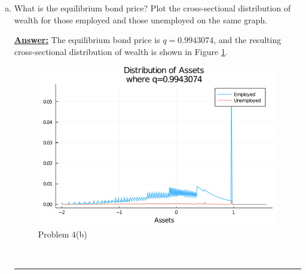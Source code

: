 \documentclass{article} %
\theoremstyle{definition}
\newenvironment{solution}[1][Answer]{\begin{singlespace}\underline{\textbf{#1:}}\quad }{\ \rule{0.3em}{0.3em}\end{singlespace}} %
\begin{document}
\begin{enumerate}[I.]
\begin{enumerate}[4.]
\begin{enumerate}[a.]
				\item What is the equilibrium bond price? Plot the cross-sectional distribution of wealth for those employed and those unemployed on the same graph.
				\begin{solution}
					The equilibrium bond price is $q=0.9943074$, and the resulting cross-sectional distribution of wealth is shown in Figure \ref{4b}.
				\begin{figure}[htbp!]
					\centering
					\includegraphics[scale=.5]{ForIncludingInDocument/Distribution.png}
					\caption{Problem 4(b) \label{4b}}
					\end{figure}
				\end{solution}


\end{enumerate}
\end{enumerate}
\end{enumerate}
\end{document}
